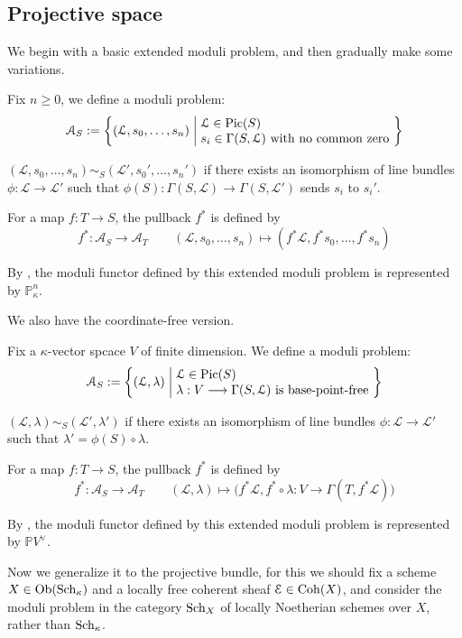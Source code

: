 \subsection{Projective space}
We begin with a basic extended moduli problem, and then gradually make some variations.
\begin{eg}
Fix $n \geqslant 0$, we define a moduli problem:
$$\mathcal{A}_S:=\left\{(\mathcal{L},s_0,\ldots,s_n)  \;\middle|\; \begin{aligned}
&\\[-5mm]
&\mathcal{L} \in \operatorname{Pic}(S)\\[-1mm]
& s_i \in \Gamma(S,\mathcal{L}) \text{ with no common zero }
\end{aligned}
 \right\}$$
 
  $(\mathcal{L},s_0,\ldots,s_n) \sim_S (\mathcal{L}',s_0',\ldots,s_n')$ if there exists an isomorphism of line bundles $\phi:\mathcal{L} \longrightarrow \mathcal{L}'$ such that $\phi(S):\Gamma(S,\mathcal{L}) \longrightarrow \Gamma(S,\mathcal{L}')$ sends $s_i$ to $s_i'$.
  
  For a map $f:T \longrightarrow S$, the pullback $f^*$ is defined by
     $$f^*:\mathcal{A}_S \longrightarrow \mathcal{A}_T \qquad (\mathcal{L},s_0,\ldots,s_n) \longmapsto (f^*\mathcal{L},f^*s_0,\ldots,f^*s_n)$$
     
By \cite[15.3.F, 16.4.1]{FOAG}, the moduli functor defined by this extended moduli problem is represented by $\mathbb{P}_{\kappa}^n$.
\end{eg}
We also have the coordinate-free version.
\begin{eg}[{Coordinate-free projective space $\mathbb{P}V^{\vee}=\Proj(\Sym^{\bullet} V)$, see \cite[4.5.12]{FOAG}}]
Fix a $\kappa$-vector spcace $V$ of finite dimension. We define a moduli problem:
$$\mathcal{A}_S:=\left\{(\mathcal{L},\lambda)  \;\middle|\; \begin{aligned}
&\\[-5mm]
&\mathcal{L} \in \operatorname{Pic}(S)\\[-1mm]
& \lambda:V \longrightarrow \Gamma(S,\mathcal{L}) \text{ is base-point-free }
\end{aligned}
 \right\}$$
 
   $(\mathcal{L},\lambda) \sim_S (\mathcal{L}',\lambda')$ if there exists an isomorphism of line bundles $\phi:\mathcal{L} \longrightarrow \mathcal{L}'$ such that $\lambda'=\phi(S) \circ \lambda$.
   
   For a map $f:T \longrightarrow S$, the pullback $f^*$ is defined by
      $$f^*:\mathcal{A}_S \longrightarrow \mathcal{A}_T \qquad (\mathcal{L},\lambda) \longmapsto \big(f^*\mathcal{L},f^*\circ \lambda:V \rightarrow \Gamma(T,f^*\mathcal{L})\big)$$
      
      By \cite[16.4.E]{FOAG}, the moduli functor defined by this extended moduli problem is represented by $\mathbb{P}V^{\vee}$.
\end{eg}
Now we generalize it to the projective bundle, for this we should fix a scheme $X \in \operatorname{Ob}(\operatorname{Sch}_{\kappa})$ and a locally free coherent sheaf $\mathcal{E} \in \operatorname{Coh}(X)$, and consider the moduli problem in the category $\operatorname{Sch}_{X}$ of locally Noetherian schemes over $X$, rather than $\operatorname{Sch}_{\kappa}$.

